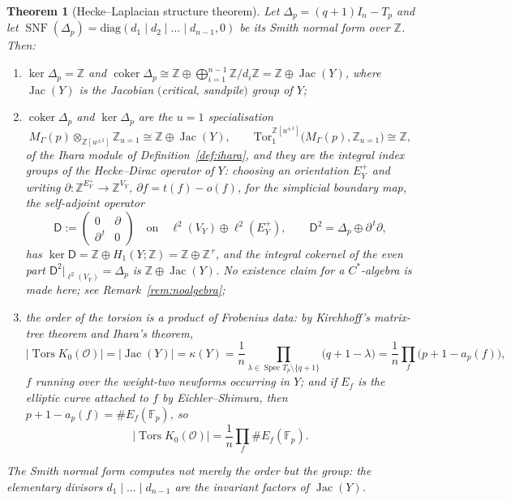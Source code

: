 \documentclass[11pt]{amsart}
\numberwithin{equation}{section}
\newtheorem{theorem}{Theorem}[section]
\theoremstyle{definition}
\theoremstyle{remark}
\newcommand{\Z}{\mathbb{Z}}
\newcommand{\F}{\mathbb{F}}
\newcommand{\cO}{\mathcal{O}}
\newcommand{\coker}{\operatorname{coker}}
\newcommand{\Tors}{\operatorname{Tors}}
\newcommand{\SNF}{\operatorname{SNF}}
\newcommand{\Jac}{\operatorname{Jac}}
\newcommand{\Spec}{\operatorname{Spec}}
\begin{document}
\begin{theorem}[Hecke--Laplacian structure theorem]\label{thm:structure}
Let $\Delta_p=(q+1)I_n-T_p$ and let
$\SNF(\Delta_p)=\mathrm{diag}(d_1\mid d_2\mid\dots\mid d_{n-1},0)$ be its Smith normal
form over $\Z$. Then:
\begin{enumerate}
\item[(i)] $\ker\Delta_p=\Z$ and
$\coker\Delta_p\cong\Z\oplus\bigoplus_{i=1}^{n-1}\Z/d_i\Z
=\Z\oplus\Jac(Y)$,
where $\Jac(Y)$ is the Jacobian $($critical, sandpile$)$ group of $Y$;
\item[(ii)] $\coker\Delta_p$ and $\ker\Delta_p$ are the $u=1$ specialisation
\[
M_\Gamma(p)\otimes_{\Z[u^{\pm1}]}\Z_{u=1}\cong\Z\oplus\Jac(Y),
\qquad
\mathrm{Tor}_1^{\Z[u^{\pm1}]}\bigl(M_\Gamma(p),\Z_{u=1}\bigr)\cong\Z,
\]
of the Ihara module of Definition~\ref{def:ihara}, and they are the integral index
groups of the \emph{Hecke--Dirac operator} of $Y$: choosing an orientation $E_Y^+$ and
writing $\partial\colon\Z^{E_Y^+}\to\Z^{V_Y}$, $\partial f=t(f)-o(f)$, for the simplicial
boundary map, the self-adjoint operator
\[
\mathsf{D}:=\begin{pmatrix}0&\partial\\ \partial^{\,t}&0\end{pmatrix}
\quad\text{on}\quad \ell^2(V_Y)\oplus\ell^2(E_Y^+),
\qquad
\mathsf{D}^2=\Delta_p\oplus\partial^{\,t}\partial ,
\]
has $\ker\mathsf{D}=\Z\oplus H_1(Y;\Z)=\Z\oplus\Z^{\,r}$, and the integral cokernel of
the even part $\mathsf{D}^2|_{\ell^2(V_Y)}=\Delta_p$ is $\Z\oplus\Jac(Y)$. \emph{No
existence claim for a $C^*$-algebra is made here}; see Remark~\ref{rem:noalgebra};
\item[(iii)] the order of the torsion is a product of Frobenius data: by Kirchhoff's
matrix-tree theorem and Ihara's theorem,
\begin{equation}\label{eq:torsionorder}
\bigl|\Tors K_0(\cO)\bigr|=|\Jac(Y)|=\kappa(Y)
=\frac1n\prod_{\lambda\in\Spec T_p\setminus\{q+1\}}\bigl(q+1-\lambda\bigr)
=\frac1n\prod_f\bigl(p+1-a_p(f)\bigr),
\end{equation}
$f$ running over the weight-two newforms occurring in $Y$; and if $E_f$ is the elliptic
curve attached to $f$ by Eichler--Shimura, then $p+1-a_p(f)=\#E_f(\F_p)$, so
\[
\bigl|\Tors K_0(\cO)\bigr|=\frac1n\prod_f\#E_f(\F_p).
\]
\end{enumerate}
The Smith normal form computes not merely the order but the group: the elementary
divisors $d_1\mid\dots\mid d_{n-1}$ are the invariant factors of $\Jac(Y)$.
\end{theorem}
\end{document}
